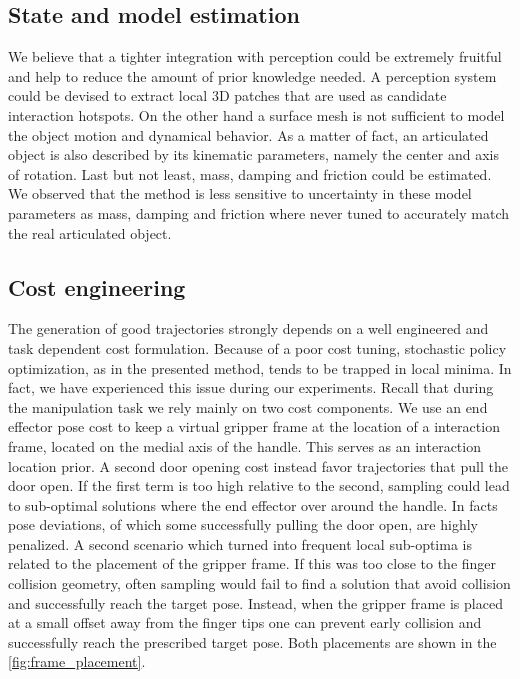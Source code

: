 \subsection{State and model estimation}
We believe that a tighter integration with perception could be extremely fruitful and help to reduce the amount of prior knowledge needed. A perception system could be devised to extract local 3D patches that are used as candidate interaction hotspots. On the other hand a surface mesh is not sufficient to model the object motion and dynamical behavior. As a matter of fact, an articulated object is also described by its kinematic parameters, namely the center and axis of rotation. Last but not least, mass, damping and friction could be estimated. We observed that the method is less sensitive to uncertainty in these model parameters as mass, damping and friction where never tuned to accurately match the real articulated object. 

\subsection{Cost engineering}
The generation of good trajectories strongly depends on a well engineered and task dependent cost formulation. Because of a poor cost tuning, stochastic policy optimization, as in the presented method, tends to be trapped in local minima. In fact, we have experienced this issue during our experiments. Recall that during the manipulation task we rely mainly on two cost components. We use an end effector pose cost to keep a virtual gripper frame at the location of a interaction frame, located on the medial axis of the handle. This serves as an interaction location prior. A second door opening cost instead favor trajectories that pull the door open. If the first term is too high relative to the second, sampling could lead to sub-optimal solutions where the end effector over around the handle. In facts pose deviations, of which some successfully pulling the door open, are highly penalized. A second scenario which turned into frequent local sub-optima is related to the placement of the gripper frame. If this was too close to the finger collision geometry, often sampling would fail to find a solution that avoid collision and successfully reach the target pose. Instead, when the gripper frame is placed at a small offset away from the finger tips one can prevent early collision and successfully reach the prescribed target pose. Both placements are shown in the \fig \ref{fig:frame_placement}.

